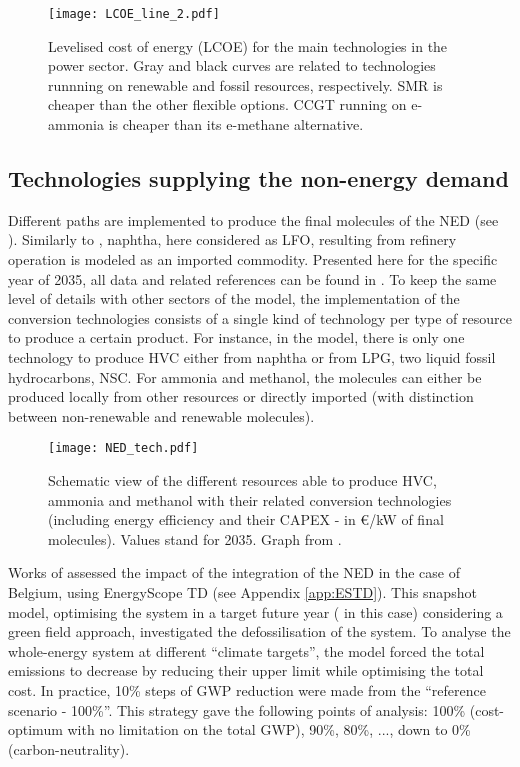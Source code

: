 \begin{figure}[htbp!]
\centering
\texttt{[image: LCOE\_line\_2.pdf]}
\caption{Levelised cost of energy (LCOE) for the main technologies in the power sector. Gray and black curves are related to technologies runnning on renewable and fossil resources, respectively. \gls{SMR} is cheaper than the other flexible options. \gls{CCGT} running on e-ammonia is cheaper than its e-methane alternative.}
\label{fig:LCOE}
\end{figure}

\subsection{Technologies supplying the non-energy demand}
\label{subsec:cs:NED_tech}

Different paths are implemented to produce the final molecules of the NED (see ). Similarly to \citet{tsiropoulos2018emerging}, naphtha, here considered as \gls{LFO}, resulting from refinery operation is modeled as an imported commodity. Presented here for the specific year of 2035, all data and related references can be found in \cite{GIT_NED}. To keep the same level of details with other sectors of the model, the implementation of the conversion technologies consists of a single kind of technology per type of resource to produce a certain product. For instance, in the model, there is only one technology to produce \gls{HVC} either from naphtha or from LPG, two liquid fossil hydrocarbons, \ie \gls{NSC}. For ammonia and methanol, the molecules can either be produced locally from other resources or directly imported (with distinction between non-renewable and renewable molecules). 

\begin{figure}[htbp!]
\centering
\texttt{[image: NED\_tech.pdf]}
\caption{Schematic view of the different resources able to produce \gls{HVC}, ammonia and methanol with their related conversion technologies (including energy efficiency and their CAPEX - in €/kW of final molecules).  Values stand for 2035. Graph from \cite{rixhon2021comprehensive}.}
\label{fig:NED_tech}
\end{figure}
%

Works of \citet{rixhon2021comprehensive,rixhon2022integration} assessed the impact of the integration of the \gls{NED} in the case of Belgium, using EnergyScope TD (see Appendix \ref{app:ESTD}).  This snapshot model, \ie optimising the system in a target future year ( in this case) considering a green field approach, investigated the defossilisation of the system. To analyse the whole-energy system at different ``climate targets'', the model forced the total emissions to decrease by reducing their upper limit while optimising the total cost. In practice, 10\% steps of \gls{GWP} reduction were made from the ``reference scenario - 100\%''. This strategy gave the following points of analysis: 100\% (\ie cost-optimum with no limitation on the total \gls{GWP}), 90\%, 80\%, ..., down to 0\% (\ie  carbon-neutrality).

